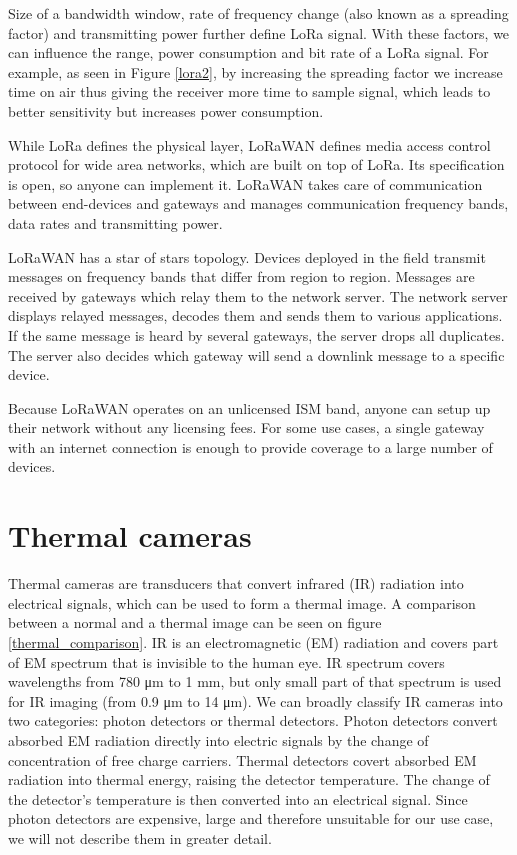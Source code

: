 Size of a bandwidth window, rate of frequency change (also known as a spreading factor) and transmitting power further define LoRa signal.
With these factors, we can influence the range, power consumption and bit rate of a LoRa signal.
For example, as seen in Figure \ref{lora2}, by increasing the spreading factor we increase time on air thus giving the receiver more time to sample signal, which leads to better sensitivity but increases power consumption.

While LoRa defines the physical layer, LoRaWAN defines media access control protocol for wide area networks, which are built on top of LoRa\cite{lora_article}.
Its specification is open, so anyone can implement it.
LoRaWAN takes care of communication between end-devices and gateways and manages communication frequency bands, data rates and transmitting power.

LoRaWAN has a star of stars topology\cite{lora_article}.
Devices deployed in the field transmit messages on frequency bands that differ from region to region. 
Messages are received by gateways which relay them to the network server.
The network server displays relayed messages, decodes them and sends them to various applications.
If the same message is heard by several gateways, the server drops all duplicates.
The server also decides which gateway will send a downlink message to a specific device. 

Because LoRaWAN operates on an unlicensed ISM band, anyone can setup up their network without any licensing fees.
For some use cases, a single gateway with an internet connection is enough to provide coverage to a large number of devices.


\section{ Thermal cameras} \label{thermal_cameras}

Thermal cameras are transducers that convert infrared (IR) radiation into electrical signals, which can be used to form a thermal image.
A comparison between a normal and a thermal image can be seen on figure \ref{thermal_comparison}.
IR is an electromagnetic (EM) radiation and covers part of EM spectrum that is invisible to the human eye.
IR spectrum covers wavelengths from 780 \si{\micro\meter} to 1 \si{\milli\meter}, but only small part of that spectrum is used for IR imaging (from 0.9 \si{\micro\meter} to 14 \si{\micro\meter})\cite{thermal_book}.
We can broadly classify IR cameras into two categories: photon detectors or thermal detectors\cite{thermal_book}.
Photon detectors convert absorbed EM radiation directly into electric signals by the change of concentration of free charge carriers\cite{thermal_book}.
Thermal detectors covert absorbed EM radiation into thermal energy, raising the detector temperature\cite{thermal_book}. 
The change of the detector's temperature is then converted into an electrical signal.
Since photon detectors are expensive, large and therefore unsuitable for our use case, we will not describe them in greater detail.
\newline 

